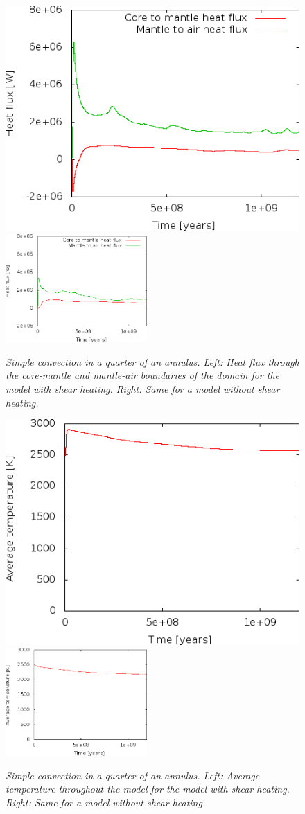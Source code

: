 \documentclass{article}
\begin{document}
\begin{figure}[tb]
  \includegraphics[width=.48\textwidth]{cookbooks/shell_simple_2d/doc/heat-flux.png}
  \hfill
  \includegraphics[width=0.48\textwidth]{cookbooks/shell_simple_2d/doc/heat-flux-noshear.png}
  \caption{\it Simple convection in a quarter of an annulus. Left: Heat flux
  through the core-mantle and mantle-air boundaries of the domain for the
  model with shear heating. Right: Same for a model without shear heating.}
  \label{fig:simple-shell-2d-heatflux}
\end{figure}


\begin{figure}[tb]
  \includegraphics[width=.48\textwidth]{cookbooks/shell_simple_2d/doc/avg-temperature.png}
  \hfill
  \includegraphics[width=0.48\textwidth]{cookbooks/shell_simple_2d/doc/avg-temperature-noshear.png}
  \caption{\it Simple convection in a quarter of an annulus. Left: Average
  temperature throughout the model for the
  model with shear heating. Right: Same for a model without shear heating.}
  \label{fig:simple-shell-2d-temperature}
\end{figure}
\end{document}
